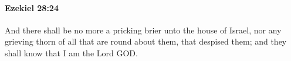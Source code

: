 
		\paragraph{Ezekiel 28:24} %
			\label{EZEKIEL-28-24}

			And there shall be no more a pricking brier unto the house of Israel, nor any grieving thorn of all that are round about them, that despised them; and they shall know that I am the Lord GOD.


